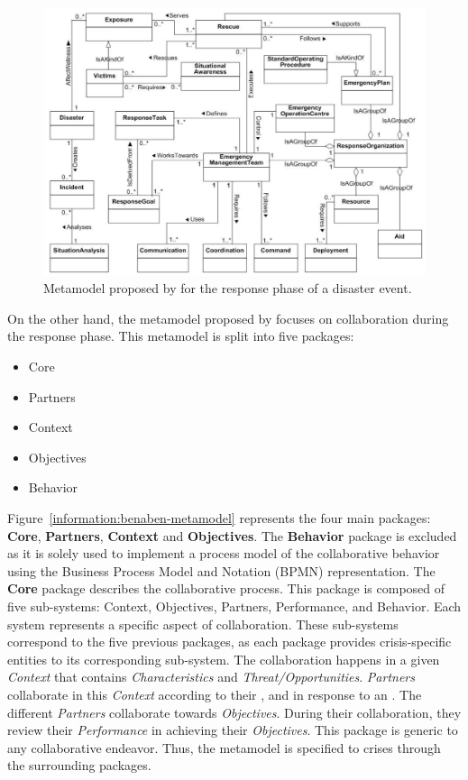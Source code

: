 \begin{figure}[htb]
    \centering
    \includegraphics[width=\textwidth]{figures/chap-3/othman-metamodel-response.PNG}
    \caption{Metamodel proposed by \textcite[Fig.4]{othmanDevelopmentValidationDisaster2014} for the response phase of a disaster event.}
    \label{information:othman-metamodel}
\end{figure}

On the other hand, the metamodel proposed by \textcite{benabenMetamodelKnowledgeManagement2016} focuses on collaboration during the response phase.
This metamodel is split into five packages:

\begin{itemize}
    \item Core
    \item Partners
    \item Context
    \item Objectives
    \item Behavior
\end{itemize}

Figure~\ref{information:benaben-metamodel} represents the four main packages: \textbf{Core}, \textbf{Partners}, \textbf{Context} and \textbf{Objectives}.
The \textbf{Behavior} package is excluded as it is solely used to implement a process model of the collaborative behavior using the Business Process Model and Notation (BPMN) representation.
The \textbf{Core} package describes the collaborative process.
This package is composed of five sub-systems: Context, Objectives, Partners, Performance, and Behavior.
Each system represents a specific aspect of collaboration.
These sub-systems correspond to the five previous packages, as each package provides crisis-specific entities to its corresponding sub-system.
The collaboration happens in a given \textit{Context} that contains \textit{Characteristics} and \textit{Threat/Opportunities}.
\textit{Partners} collaborate in this \textit{Context} according to their , and  in response to an .
The different \textit{Partners} collaborate towards \textit{Objectives}.
During their collaboration, they review their \textit{Performance} in achieving their \textit{Objectives}.
This package is generic to any collaborative endeavor.
Thus, the metamodel is specified to crises through the surrounding packages.

